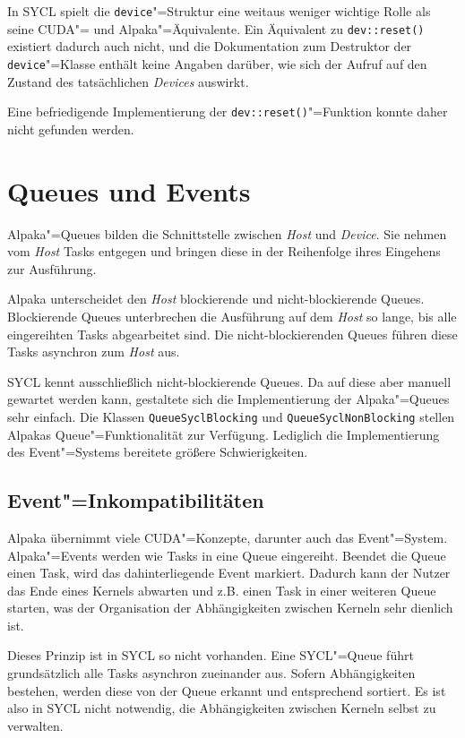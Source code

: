 In SYCL spielt die \texttt{device}"=Struktur eine weitaus weniger wichtige
Rolle als seine CUDA"= und Alpaka"=Äquivalente. Ein Äquivalent zu
\texttt{dev::reset()} existiert dadurch auch nicht, und die Dokumentation zum
Destruktor der \texttt{device}"=Klasse enthält keine Angaben darüber, wie sich
der Aufruf auf den Zustand des tatsächlichen \textit{Devices} auswirkt.

Eine befriedigende Implementierung der \texttt{dev::reset()}"=Funktion konnte
daher nicht gefunden werden.

\section{Queues und Events}
\label{implementierung:queue}

Alpaka"=Queues bilden die Schnittstelle zwischen \textit{Host} und
\textit{Device}. Sie nehmen vom \textit{Host} Tasks entgegen und bringen diese
in der Reihenfolge ihres Eingehens zur Ausführung.

Alpaka unterscheidet den \textit{Host} blockierende und nicht-blockierende
Queues. Blockierende Queues unterbrechen die Ausführung auf dem \textit{Host} so
lange, bis alle eingereihten Tasks abgearbeitet sind. Die nicht-blockierenden
Queues führen diese Tasks asynchron zum \textit{Host} aus.

SYCL kennt ausschließlich nicht-blockierende Queues. Da auf diese aber manuell
gewartet werden kann, gestaltete sich die Implementierung der Alpaka"=Queues
sehr einfach. Die Klassen \texttt{QueueSyclBlocking} und
\texttt{QueueSyclNonBlocking} stellen Alpakas Queue"=Funktionalität zur
Verfügung. Lediglich die Implementierung des Event"=Systems bereitete größere
Schwierigkeiten.

\subsection{Event"=Inkompatibilitäten}

Alpaka übernimmt viele CUDA"=Konzepte, darunter auch das Event"=System.
Alpaka"=Events werden wie Tasks in eine Queue eingereiht. Beendet die Queue
einen Task, wird das dahinterliegende Event markiert. Dadurch kann der Nutzer
das Ende eines Kernels abwarten und z.B. einen Task in einer weiteren Queue
starten, was der Organisation der Abhängigkeiten zwischen Kerneln sehr dienlich
ist.

Dieses Prinzip ist in SYCL so nicht vorhanden. Eine SYCL"=Queue führt
grundsätzlich alle Tasks asynchron zueinander aus. Sofern Abhängigkeiten
bestehen, werden diese von der Queue erkannt und entsprechend sortiert. Es ist
also in SYCL nicht notwendig, die Abhängigkeiten zwischen Kerneln selbst zu
verwalten.

